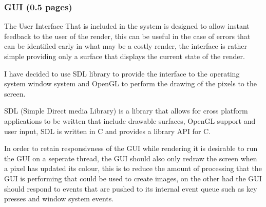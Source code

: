 
\subsubsection{GUI (0.5 pages)}

The User Interface That is included in the system is designed to allow instant feedback to the user of the render, this can be
useful in the case of errors that can be identified early in what may be a costly render, the interface is rather simple
providing only a surface that displays the current state of the render.

I have decided to use SDL library to provide the interface to the operating system window system and OpenGL to perform the 
drawing of the pixels to the screen.

SDL (Simple Direct media Library) is a library that allows for cross platform applications to be written that include
drawable surfaces, OpenGL support and user input, SDL is written in C and provides a library API for C.

In order to retain responsivness of the GUI while rendering it is desirable to run the GUI on a seperate thread, the GUI
should also only redraw the screen when a pixel has updated its colour, this is to reduce the amount of processing that
the GUI is performing that could be used to create images, on the other had the GUI should respond to events that are pushed
to its internal event queue such as key presses and window system events.

